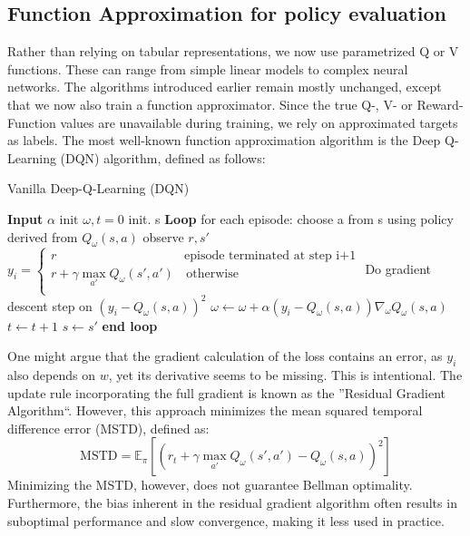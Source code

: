 \subsection{Function Approximation for policy evaluation}
Rather than relying on tabular representations, we now use parametrized Q or V functions.
These can range from simple linear models to complex neural networks. The algorithms introduced
earlier remain mostly unchanged, except that we now also train a function approximator. 
Since the true Q-, V- or Reward-Function values are unavailable during training, we rely on approximated
targets as labels. The most well-known function approximation algorithm is
the Deep Q-Learning (DQN) algorithm, defined as follows:
 \begin{algorithm}[H]
  \large
    \caption{Vanilla Deep-Q-Learning (DQN)}\label{vanilla_dqn}
    \begin{algorithmic}
    \STATE \textbf{Input} $\alpha$
    \STATE $\text{init } \omega , t = 0$
    \STATE init. s
    \STATE \textbf{Loop} for each episode:
    \STATE \quad choose a from s using policy derived from $Q_\omega(s,a)$
    \STATE \quad observe $r,s'$ 
    \STATE \quad $y_i = \left\{
\begin{array}{ll}
r & \text{episode terminated at step i+1} \\
r + \gamma \max\limits_{a'}Q_\omega(s',a') & \, \textrm{otherwise} \\
\end{array}
\right. $
    \STATE \quad Do gradient descent step on $(y_i- Q_\omega(s,a))^2$ 
    \STATE \quad  $\omega \gets \omega + \alpha (y_i -  Q_\omega(s,a))\nabla_\omega  Q_{\omega}(s,a)$
    \STATE \quad $t \gets t+1$
    \STATE \quad $s \gets s'$
    \STATE \textbf{end loop}
    \end{algorithmic}
\end{algorithm}
One might argue that the gradient calculation of the loss contains an error, 
as $y_i$ also depends on $w$, yet its derivative seems to be missing. This is intentional.
The update rule incorporating the full gradient is known as the ''Residual Gradient Algorithm``. 
However, this approach minimizes the mean squared temporal difference error (MSTD), defined as:
$$ \text{MSTD} = \mathbb{E}_\pi\left[\left(r_t+\gamma \max\limits_{a'}Q_\omega(s',a')-Q_\omega(s, a)
\right)^2\right] \label{MSTD}$$ Minimizing the MSTD, however, does not guarantee Bellman optimality. 
Furthermore, the bias inherent in the residual gradient algorithm often results in 
suboptimal performance and slow convergence, making it less used in practice.\newline

